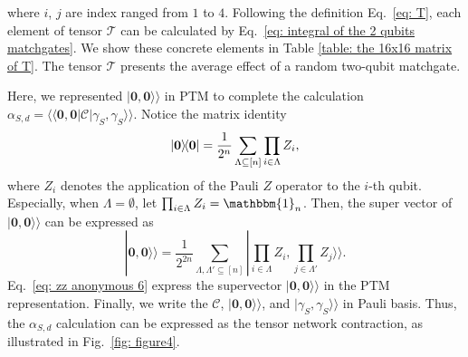 \documentclass[journal=jctcce,a4paper,manuscript=article]{achemso}
\newcommand{\supket}[1]{|#1 \rangle\rangle}
\newcommand{\supbra}[1]{\langle\langle #1 |}
\newcommand{\Tcal}{\mathcal{T}}
\begin{document}
where $i$, $j$ are index ranged from $1$ to $4$. Following the definition
Eq.~\eqref{eq: T}, each element of tensor $\Tcal$ can be calculated by
Eq.~\eqref{eq: integral of the 2 qubits matchgates}. We show these concrete
elements in Table \ref{table: the 16x16 matrix of T}. The tensor $\Tcal$
presents the average effect of a random two-qubit matchgate.

Here, we represented $\supket{\bm 0,\bm 0}$ in PTM to complete the calculation
$\alpha_{S,d} = \supbra{\bm 0,\bm 0} \mathcal{C}\supket{\gamma_S, \gamma_S}$.
Notice the matrix identity
\begin{equation}
  \ketbra{\bm 0} = \frac{1}{2^n} \sum_{\Lambda\subseteq [n]} \prod_{i \in \Lambda} Z_i,
\end{equation}
where $Z_i$ denotes the application of the Pauli $Z$ operator to the $i$-th qubit.
Especially, when $\Lambda = \emptyset$, let $\prod_{i \in \Lambda} Z_i = \mathbbm{1}_n$. Then, the super vector of $\supket{\bm 0, \bm 0}$ can be expressed as
\begin{equation}
  \label{eq: zz anonymous 6}
  \supket{\bm 0, \bm 0} = \frac{1}{2^{2n}} \sum_{\Lambda, \Lambda' \subseteq [n]}  \supket{\prod_{i \in \Lambda }  Z_i, \prod_{j \in \Lambda'} Z_j}.
\end{equation}
Eq.~\eqref{eq: zz anonymous 6} express the supervector $\supket{\bm 0, \bm 0}$ in the PTM representation. Finally, we write the $\mathcal{C}$, $\supket{\bm 0, \bm 0}$, and $\supket{\gamma_S, \gamma_S}$ in Pauli basis.
Thus, the $\alpha_{S,d}$ calculation can be expressed as the tensor network contraction, as illustrated in Fig.~\ref{fig: figure4}.
\end{document}
